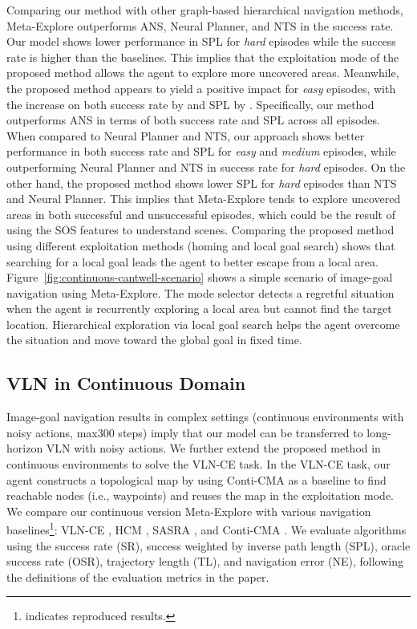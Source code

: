 \documentclass[10pt,twocolumn,letterpaper]{article}
\begin{document}
Comparing our method with other graph-based hierarchical navigation methods, Meta-Explore outperforms ANS, Neural Planner, and NTS in the success rate. Our model shows lower performance in SPL for \textit{hard} episodes while the success rate is higher than the baselines. This implies that the exploitation mode of the proposed method allows the agent to explore more uncovered areas. Meanwhile, the proposed method appears to yield a positive impact for \textit{easy} episodes, with the increase on both success rate by  and SPL by . Specifically, our method outperforms ANS in terms of both success rate and SPL across all episodes. When compared to Neural Planner and NTS, our approach shows better performance in both success rate and SPL for \textit{easy} and \textit{medium} episodes, while outperforming Neural Planner and NTS in success rate for \textit{hard} episodes.
On the other hand, the proposed method shows lower SPL for \textit{hard} episodes than NTS and Neural Planner. This implies that Meta-Explore tends to explore uncovered areas in both successful and unsuccessful episodes, which could be the result of using the SOS features to understand scenes. Comparing the proposed method using different exploitation methods (homing and local goal search) shows that searching for a local goal leads the agent to better escape from a local area. Figure~\ref{fig:continuous-cantwell-scenario} shows a simple scenario of image-goal navigation using Meta-Explore. The mode selector detects a regretful situation when the agent is recurrently exploring a local area but cannot find the target location. Hierarchical exploration via local goal search helps the agent overcome the situation and move toward the global goal in fixed time.

\subsection{VLN in Continuous Domain}

Image-goal navigation results in complex settings (continuous environments with noisy actions, max300 steps) imply that our model can be transferred to long-horizon VLN with noisy actions. We further extend the proposed method in continuous environments to solve the VLN-CE \cite{krantz_vlnce_2020} task. In the VLN-CE \cite{krantz_vlnce_2020} task, our agent constructs a topological map by using Conti-CMA \cite{hong2022bridging} as a baseline to find reachable nodes (i.e., waypoints) and reuses the map in the exploitation mode. 
We compare our continuous version Meta-Explore with various navigation baselines\footnote{ indicates reproduced results.}: VLN-CE \cite{krantz_vlnce_2020}, HCM \cite{irshad2021hierarchical}, SASRA \cite{Irshad2021sarsa}, and Conti-CMA \cite{hong2022bridging}. We evaluate algorithms using the success rate (SR), success weighted by inverse path length (SPL), oracle success rate (OSR), trajectory length (TL), and navigation error (NE), following the definitions of the evaluation metrics in the paper.
\end{document}
